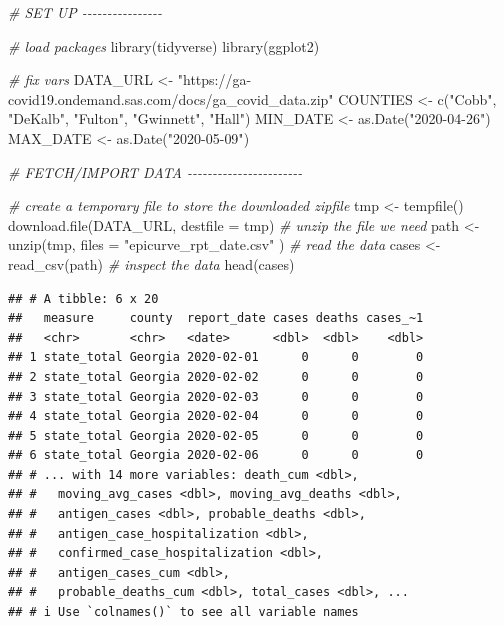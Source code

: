 \documentclass[
  12pt,
]{style/krantz}
\newenvironment{Shaded}{\begin{snugshade}}{\end{snugshade}}
\newcommand{\AttributeTok}[1]{\textcolor[rgb]{0.77,0.63,0.00}{#1}}
\newcommand{\CommentTok}[1]{\textcolor[rgb]{0.56,0.35,0.01}{\textit{#1}}}
\newcommand{\FunctionTok}[1]{\textcolor[rgb]{0.00,0.00,0.00}{#1}}
\newcommand{\NormalTok}[1]{#1}
\newcommand{\OtherTok}[1]{\textcolor[rgb]{0.56,0.35,0.01}{#1}}
\newcommand{\StringTok}[1]{\textcolor[rgb]{0.31,0.60,0.02}{#1}}
\begin{document}
\begin{Shaded}
\begin{Highlighting}[]
\CommentTok{\# SET UP {-}{-}{-}{-}{-}{-}{-}{-}{-}{-}{-}{-}{-}{-}{-}{-}}

\CommentTok{\# load packages}
\FunctionTok{library}\NormalTok{(tidyverse)}
\FunctionTok{library}\NormalTok{(ggplot2)}

\CommentTok{\# fix vars}
\NormalTok{DATA\_URL }\OtherTok{\textless{}{-}} \StringTok{"https://ga{-}covid19.ondemand.sas.com/docs/ga\_covid\_data.zip"}
\NormalTok{COUNTIES }\OtherTok{\textless{}{-}} \FunctionTok{c}\NormalTok{(}\StringTok{"Cobb"}\NormalTok{, }\StringTok{"DeKalb"}\NormalTok{, }\StringTok{"Fulton"}\NormalTok{, }\StringTok{"Gwinnett"}\NormalTok{, }\StringTok{"Hall"}\NormalTok{)}
\NormalTok{MIN\_DATE }\OtherTok{\textless{}{-}} \FunctionTok{as.Date}\NormalTok{(}\StringTok{"2020{-}04{-}26"}\NormalTok{)}
\NormalTok{MAX\_DATE }\OtherTok{\textless{}{-}} \FunctionTok{as.Date}\NormalTok{(}\StringTok{"2020{-}05{-}09"}\NormalTok{)}


\CommentTok{\# FETCH/IMPORT DATA {-}{-}{-}{-}{-}{-}{-}{-}{-}{-}{-}{-}{-}{-}{-}{-}{-}{-}{-}{-}{-}{-}{-}}

\CommentTok{\# create a temporary file to store the downloaded zipfile}
\NormalTok{tmp }\OtherTok{\textless{}{-}} \FunctionTok{tempfile}\NormalTok{()}
\FunctionTok{download.file}\NormalTok{(DATA\_URL, }\AttributeTok{destfile =}\NormalTok{ tmp)}
\CommentTok{\# unzip the file we need}
\NormalTok{path }\OtherTok{\textless{}{-}} \FunctionTok{unzip}\NormalTok{(tmp, }\AttributeTok{files =} \StringTok{"epicurve\_rpt\_date.csv"}\NormalTok{ )}
\CommentTok{\# read the data}
\NormalTok{cases }\OtherTok{\textless{}{-}} \FunctionTok{read\_csv}\NormalTok{(path)}
\CommentTok{\# inspect the data}
\FunctionTok{head}\NormalTok{(cases)}
\end{Highlighting}
\end{Shaded}

\begin{verbatim}
## # A tibble: 6 x 20
##   measure     county  report_date cases deaths cases_~1
##   <chr>       <chr>   <date>      <dbl>  <dbl>    <dbl>
## 1 state_total Georgia 2020-02-01      0      0        0
## 2 state_total Georgia 2020-02-02      0      0        0
## 3 state_total Georgia 2020-02-03      0      0        0
## 4 state_total Georgia 2020-02-04      0      0        0
## 5 state_total Georgia 2020-02-05      0      0        0
## 6 state_total Georgia 2020-02-06      0      0        0
## # ... with 14 more variables: death_cum <dbl>,
## #   moving_avg_cases <dbl>, moving_avg_deaths <dbl>,
## #   antigen_cases <dbl>, probable_deaths <dbl>,
## #   antigen_case_hospitalization <dbl>,
## #   confirmed_case_hospitalization <dbl>,
## #   antigen_cases_cum <dbl>,
## #   probable_deaths_cum <dbl>, total_cases <dbl>, ...
## # i Use `colnames()` to see all variable names
\end{verbatim}
\end{document}

